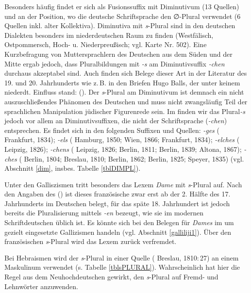   Besonders häufig findet er sich als Fusionssuffix mit Diminutivum (13 Quellen) und  an der Position, wo die deutsche Schriftsprache den ∅-Plural verwendet (6 Quellen inkl. alter Kollektiva). Diminutiva mit \textit{s}-Plural sind in den deutschen Dialekten besonders im niederdeutschen Raum zu finden (Westfälisch, Ostpommersch, Hoch- u. Niederpreußisch; vgl.  Karte Nr. 502). Eine Kurzbefragung von Muttersprachlern des Deutschen aus dem Süden und der Mitte ergab jedoch, dass Pluralbildungen mit \textit{-s} am Diminutivsuffix \textit{-chen} durchaus akzeptabel sind. Auch finden sich  Belege dieser Art in der Literatur des 19. und 20. Jahrhunderts wie z.\,B. in den Briefen Hugo Balls, der unter keinem niederdt. Einfluss stand:  (\cite[256]{Ball2003}). Der \textit{s}-Plural am Diminutivum ist demnach ein nicht auszuschließendes Phänomen des Deutschen und muss nicht zwangsläufig Teil der sprachlichen Manipulation jüdischer Figurenrede sein. Im  finden wir das Plural\textit{-s} jedoch vor allem an Diminutivsuffixen, die nicht der Schriftsprache (\textit{-chen}) entsprechen. Es findet sich in den folgenden Suffixen und Quellen: \textit{-ges} ( Frankfurt, 1834); \textit{-els} ( Hamburg, 1850;  Wien, 1866;  Frankfurt, 1834); \textit{-elches} ( Leipzig, 1826); \textit{-chens} ( Leipzig, 1826;  Berlin, 1811;  Berlin, 1839;  Altona, 1867); \textit{-ches} ( Berlin, 1804;  Breslau, 1810;  Berlin, 1862;  Berlin, 1825;  Speyer, 1835) (vgl. Abschnitt \ref{dim}, insbes. Tabelle \ref{tblDIMPL}). 

  
   Unter den Galliszismen tritt besonders das Lexem \textit{Dame} mit \textit{s}-Plural auf. Nach den Angaben des  (\citeyear[Bd. 2, Sp. 702]{DeutschesWB}) ist dieses französische  zwar erst ab der 2. Hälfte des 17. Jahrhunderts im Deutschen belegt, für das späte 18. Jahrhundert ist jedoch bereits die Pluralisierung mittels \textit{-en} bezeugt, wie sie im modernen Schriftdeutschen üblich ist. Es könnte sich bei den Belegen für \textit{Dames} im  um gezielt eingesetzte Gallizismen handeln (vgl. Abschnitt \ref{galliliji1}). Über den französischen \textit{s}-Plural wird das Lexem zurück verfremdet.
     
  Bei Hebraismen wird der \textit{s}-Plural in einer Quelle ( Breslau, 1810:\,27) an einem Maskulinum verwendet (s. Tabelle \ref{tblsPLURAL}). Wahrscheinlich hat hier die Regel aus dem Neuhochdeutschen gewirkt, den \textit{s}-Plural auf Fremd- und Lehnwörter anzuwenden.

